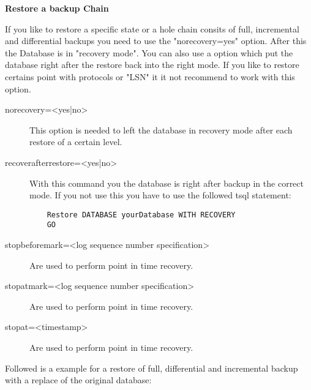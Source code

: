 {\bf Restore a backup Chain}

If you like to restore a specific state or a hole chain consits of full, incremental and differential backups you need to use the "norecovery=yes" option. After this the Database is in "recovery mode". You can also use a option which put the database right after the restore back into the right mode. If you like to restore certains point with protocols or
"LSN" it it not recommend to work with this option.

\begin{description}
  \item[norecovery=\textless yes|no\textgreater]
  This option is needed to left the database in recovery mode after each restore of a certain level.
  \item[recoverafterrestore=\textless yes|no\textgreater]
  With this command you the database is right after backup in the correct mode. If you not use this you have to use the followed tsql statement:
  \footnotesize
  \begin{verbatim}
    Restore DATABASE yourDatabase WITH RECOVERY
    GO
  \end{verbatim}
  \normalsize
  \item[stopbeforemark=\textless log sequence number specification\textgreater]
  Are used to perform point in time recovery.
  \item[stopatmark=\textless log sequence number specification\textgreater]
  Are used to perform point in time recovery.
  \item[stopat=\textless timestamp\textgreater]
  Are used to perform point in time recovery.
\end{description}

Followed is a example for a restore of full, differential and incremental backup with a replace of the original database:

